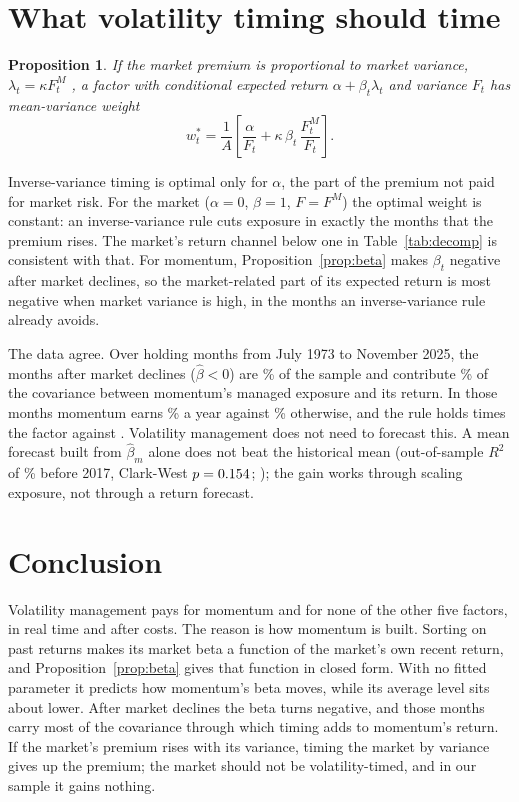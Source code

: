 \documentclass[11pt]{article}
\newtheorem{proposition}{Proposition}
\begin{document}
\section{What volatility timing should time}
\label{sec:what}

\begin{proposition}\label{prop:weight}
If the market premium is proportional to market variance, $\lambda_t=\kappa F^M_t$ \citep{merton1980}, a factor with conditional expected return $\alpha+\beta_t\lambda_t$ and variance $F_t$ has mean-variance weight
\begin{equation}
w^*_t=\frac1A\left[\frac{\alpha}{F_t}+\kappa\,\beta_t\,\frac{F^M_t}{F_t}\right].
\end{equation}
\end{proposition}

Inverse-variance timing is optimal only for $\alpha$, the part of the premium not paid for market risk. For the market ($\alpha=0$, $\beta=1$, $F=F^M$) the optimal weight is constant: an inverse-variance rule cuts exposure in exactly the months that the premium rises. The market's return channel below one in Table~\ref{tab:decomp} is consistent with that. For momentum, Proposition~\ref{prop:beta} makes $\beta_t$ negative after market declines, so the market-related part of its expected return is most negative when market variance is high, in the months an inverse-variance rule already avoids.

The data agree. Over \LOneMonths{} holding months from July 1973 to November 2025, the months after market declines ($\hat\beta<0$) are \LOneShareMonths\% of the sample and contribute \LOneShareCov\% of the covariance between momentum's managed exposure and its return. In those months momentum earns \LOneMeanFNeg\% a year against \LOneMeanFPos\% otherwise, and the rule holds \LOneMeanWNeg{} times the factor against \LOneMeanWPos{}. Volatility management does not need to forecast this. A mean forecast built from $\hat\beta_m$ alone does not beat the historical mean (out-of-sample $R^2$ of \LTwoRUnwPre\% before 2017, Clark-West $p=0.154{}$; \citealp{clark2007}); the gain works through scaling exposure, not through a return forecast.

\section{Conclusion}

Volatility management pays for momentum and for none of the other five factors, in real time and after costs. The reason is how momentum is built. Sorting on past returns makes its market beta a function of the market's own recent return, and Proposition~\ref{prop:beta} gives that function in closed form. With no fitted parameter it predicts how momentum's beta moves, while its average level sits about \MechDAbsFull{} lower. After market declines the beta turns negative, and those months carry most of the covariance through which timing adds to momentum's return. If the market's premium rises with its variance, timing the market by variance gives up the premium; the market should not be volatility-timed, and in our sample it gains nothing.
\end{document}
